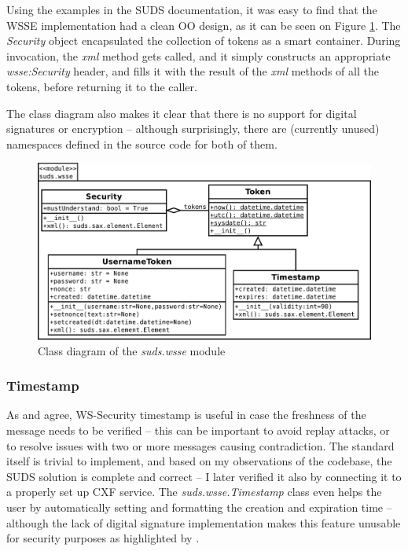 Using the examples in the SUDS documentation, it was easy to find that the WSSE implementation had a clean OO design, as it can be seen on Figure \ref{fig:clsdSudsWsse}. The \emph{Security} object encapsulated the collection of tokens as a smart container. During invocation, the \emph{xml} method gets called, and it simply constructs an appropriate \emph{wsse:Security} header, and fills it with the result of the \emph{xml} methods of all the tokens, before returning it to the caller.

The class diagram also makes it clear that there is no support for digital signatures or encryption -- although surprisingly, there are (currently unused) namespaces defined in the source code for both of them.

\begin{figure}[htbp]
 \centering
 \includegraphics[width=12cm]{images/clsdSudsWsse.pdf}
 \caption{Class diagram of the \emph{suds.wsse} module}
 \label{fig:clsdSudsWsse}
\end{figure}

\subsubsection{Timestamp}

As \cite{ibm-timestamp} and \cite{msdn-wss} agree, WS\hyp{}Security timestamp is useful in case the freshness of the message needs to be verified -- this can be important to avoid replay attacks, or to resolve issues with two or more messages causing contradiction. The standard itself is trivial to implement, and based on my observations of the codebase, the SUDS solution is complete and correct -- I later verified it also by connecting it to a properly set up CXF service. The \emph{suds.wsse.Timestamp} class even helps the user by automatically setting and formatting the creation and expiration time -- although the lack of digital signature implementation makes this feature unusable for security purposes as highlighted by \cite{osborne-wss}.

